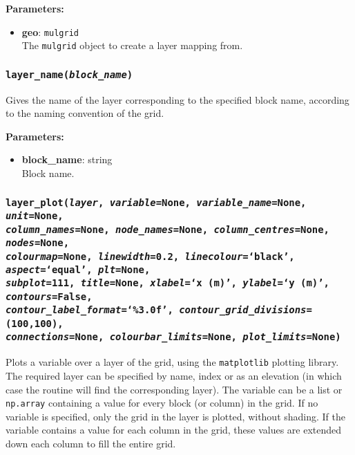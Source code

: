 \textbf{Parameters:}
\begin{itemize}
\item \textbf{geo}: \texttt{mulgrid}\\
  The \texttt{mulgrid} object to create a layer mapping from.
\end{itemize}

\subsubsection{\texttt{layer\_name(\emph{block\_name})}}

Gives the name of the layer corresponding to the specified block name, according to the naming convention of the grid.

\textbf{Parameters:}
\begin{itemize}
\item \textbf{block\_name}: string\\
  Block name.
\end{itemize}

\subsubsection{\texttt{layer\_plot(\emph{layer}, \emph{variable}=None, \emph{variable\_name}=None, \emph{unit}=None,\\
    \emph{column\_names}=None, \emph{node\_names}=None, \emph{column\_centres}=None, \emph{nodes}=None,\\
    \emph{colourmap}=None, \emph{linewidth}=0.2, \emph{linecolour}=`black', \emph{aspect}=`equal', \emph{plt}=None,\\
    \emph{subplot}=111, \emph{title}=None, \emph{xlabel}=`x (m)', \emph{ylabel}=`y (m)', \emph{contours}=False,\\
    \emph{contour\_label\_format}=`\%3.0f', \emph{contour\_grid\_divisions}=(100,100),\\
    \emph{connections}=None, \emph{colourbar\_limits}=None, \emph{plot\_limits}=None)}}

Plots a variable over a layer of the grid, using the \texttt{matplotlib} plotting library.  The required layer can be specified by name, index or as an elevation (in which case the routine will find the corresponding layer).  The variable can be a list or \texttt{np.array} containing a value for every block (or column) in the grid.  If no variable is specified, only the grid in the layer is plotted, without shading.  If the variable contains a value for each column in the grid, these values are extended down each column to fill the entire grid.

